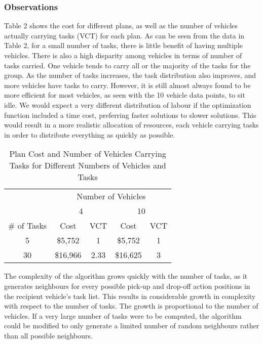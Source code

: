 \documentclass[11pt]{article}
\begin{document}
\subsubsection{Observations}
Table 2 shows the cost for different plans, as well as the number of vehicles actually carrying tasks (VCT) for each plan. As can be seen from the data in Table 2, for a small number of tasks, there is little benefit of having multiple vehicles. There is also a high disparity among vehicles in terms of number of tasks carried. One vehicle tends to carry all or the majority of the tasks for the group. As the number of tasks increases, the task distribution also improves, and more vehicles have tasks to carry. However, it is still almost always found to be more efficient for most vehicles, as seen with the 10 vehicle data points, to sit idle. We would expect a very different distribution of labour if the optimization function included a time cost, preferring faster solutions to slower solutions. This would result in a more realistic allocation of resources, each vehicle carrying tasks in order to distribute everything as quickly as possible.

\begin{table}[h]	
	\centering
	\caption{Plan Cost and Number of Vehicles Carrying Tasks for Different Numbers of Vehicles and Tasks}
	\begin{tabular}{c|c|c|c|c|}
		\cline{2-5}
		\multirow{2}{*}{} & \multicolumn{4}{c|}{Number of Vehicles} \\ \cline{2-5} 
		& \multicolumn{2}{c|}{4} & \multicolumn{2}{c|}{10} \\ \hline
		\multicolumn{1}{|c|}{\# of Tasks} & Cost & VCT & Cost & VCT \\ \hline
		\multicolumn{1}{|c|}{5} & \$5,752 & 1 & \$5,752 & 1 \\ \hline
		\multicolumn{1}{|c|}{30} & \$16,966 & 2.33 & \$16,625 & 3 \\ \hline
	\end{tabular}
\end{table}

The complexity of the algorithm grows quickly with the number of tasks, as it generates neighbours for every possible pick-up and drop-off action positions in the recipient vehicle's task list. This results in considerable growth in complexity with respect to the number of tasks. The growth is proportional to the number of vehicles. If a very large number of tasks were to be computed, the algorithm could be modified to only generate a limited number of random neighbours rather than all possible neighbours. 
\end{document}
